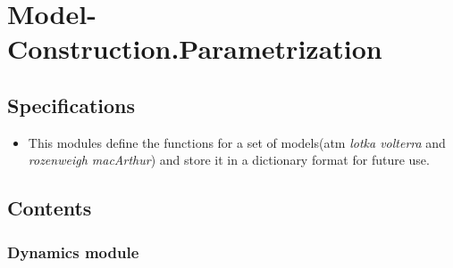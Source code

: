 \documentclass[letterpaper,10pt,english]{sphinxmanual}
\begin{document}
\chapter{Model-Construction.Parametrization}
\label{Model-Construction/modules:model-construction-parametrization}\label{Model-Construction/modules::doc}

\section{Specifications}
\label{Model-Construction/modules:specifications}\begin{itemize}
\item {} 
This modules define the functions for a set of models(atm \emph{lotka volterra} and \emph{rozenweigh macArthur}) and store it in a dictionary format for future use.

\end{itemize}


\section{Contents}
\label{Model-Construction/modules:contents}

\subsection{Dynamics module}
\label{Model-Construction/Dynamics:module-Dynamics}\label{Model-Construction/Dynamics:dynamics-module}\label{Model-Construction/Dynamics::doc}

\begin{fulllineitems}
\label{Model-Construction/Dynamics:Dynamics.set_dCLV}
\end{fulllineitems}


\begin{fulllineitems}
\label{Model-Construction/Dynamics:Dynamics.set_dCRM}
\end{fulllineitems}

\end{document}
